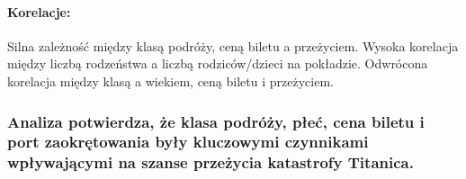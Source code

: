 \documentclass[11pt]{article}
\begin{document}
\paragraph{Korelacje:}\label{korelacje}

Silna zależność między klasą podróży, ceną biletu a przeżyciem. Wysoka
korelacja między liczbą rodzeństwa a liczbą rodziców/dzieci na
pokładzie. Odwrócona korelacja między klasą a wiekiem, ceną biletu i
przeżyciem.

\subsubsection{Analiza potwierdza, że klasa podróży, płeć, cena biletu i
port zaokrętowania były kluczowymi czynnikami wpływającymi na szanse
przeżycia katastrofy
Titanica.}\label{analiza-potwierdza-ux17ce-klasa-podruxf3ux17cy-pux142eux107-cena-biletu-i-port-zaokrux119towania-byux142y-kluczowymi-czynnikami-wpux142ywajux105cymi-na-szanse-przeux17cycia-katastrofy-titanica.}


    
    
    
\end{document}
